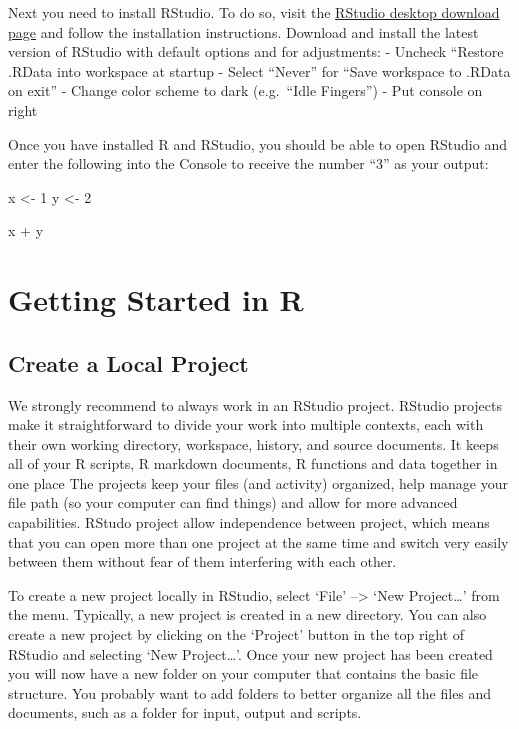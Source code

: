 \documentclass[
]{book}
\newenvironment{Shaded}{\begin{snugshade}}{\end{snugshade}}
\newcommand{\DecValTok}[1]{\textcolor[rgb]{0.00,0.00,0.81}{#1}}
\newcommand{\NormalTok}[1]{#1}
\newcommand{\OtherTok}[1]{\textcolor[rgb]{0.56,0.35,0.01}{#1}}
\newcommand{\SpecialCharTok}[1]{\textcolor[rgb]{0.00,0.00,0.00}{#1}}
\begin{document}
Next you need to install RStudio. To do so, visit the \href{https://rstudio.com/products/rstudio/download/}{RStudio desktop download page} and follow the installation instructions. Download and install the latest version of RStudio with default options and for adjustments:
- Uncheck ``Restore .RData into workspace at startup
- Select ``Never'' for ``Save workspace to .RData on exit''
- Change color scheme to dark (e.g.~``Idle Fingers'')
- Put console on right

Once you have installed R and RStudio, you should be able to open RStudio and enter the following into the Console to receive the number ``3'' as your output:

\begin{Shaded}
\begin{Highlighting}[]
\NormalTok{x }\OtherTok{\textless{}{-}} \DecValTok{1}
\NormalTok{y }\OtherTok{\textless{}{-}} \DecValTok{2}

\NormalTok{x }\SpecialCharTok{+}\NormalTok{ y}
\end{Highlighting}
\end{Shaded}

\hypertarget{getting-started-in-r}{%
\section{Getting Started in R}\label{getting-started-in-r}}

\hypertarget{create-a-local-project}{%
\subsection{Create a Local Project}\label{create-a-local-project}}

We strongly recommend to always work in an RStudio project. RStudio projects make it straightforward to divide your work into multiple contexts, each with their own working directory, workspace, history, and source documents. It keeps all of your R scripts, R markdown documents, R functions and data together in one place The projects keep your files (and activity) organized, help manage your file path (so your computer can find things) and allow for more advanced capabilities. RStudo project allow independence between project, which means that you can open more than one project at the same time and switch very easily between them without fear of them interfering with each other.

To create a new project locally in RStudio, select `File' --\textgreater{} `New Project\ldots{}' from the menu. Typically, a new project is created in a new directory. You can also create a new project by clicking on the `Project' button in the top right of RStudio and selecting `New Project\ldots{}'. Once your new project has been created you will now have a new folder on your computer that contains the basic file structure. You probably want to add folders to better organize all the files and documents, such as a folder for input, output and scripts.
\end{document}

